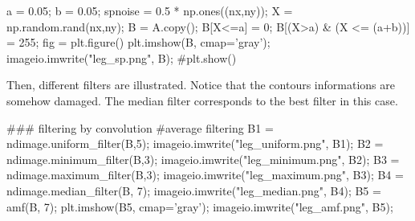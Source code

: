 \begin{figure}[H]
	\vspace*{-4pt}
	
	\hfill
	\vspace*{-8pt}%
	\label{fig:image_restoration_denoising:python:filters}%
\end{figure}

\vspace*{-6pt}

\begin{python}
a = 0.05; b = 0.05;
spnoise = 0.5 * np.ones((nx,ny));
X = np.random.rand(nx,ny);
B = A.copy();
B[X<=a] = 0;
B[(X>a) & (X <= (a+b))] = 255;
fig = plt.figure()
plt.imshow(B, cmap='gray');
imageio.imwrite("leg_sp.png", B);
#plt.show()
\end{python}

Then, different filters are illustrated. Notice that the contours informations are somehow damaged. The median filter corresponds to the best filter in this case.

\begin{python}
### filtering by convolution
#average filtering
B1 = ndimage.uniform_filter(B,5);
imageio.imwrite("leg_uniform.png", B1);
B2 = ndimage.minimum_filter(B,3);
imageio.imwrite("leg_minimum.png", B2);
B3 = ndimage.maximum_filter(B,3);
imageio.imwrite("leg_maximum.png", B3);
B4 = ndimage.median_filter(B, 7);
imageio.imwrite("leg_median.png", B4);
B5 = amf(B, 7);
plt.imshow(B5, cmap='gray');
imageio.imwrite("leg_amf.png", B5);
\end{python}



